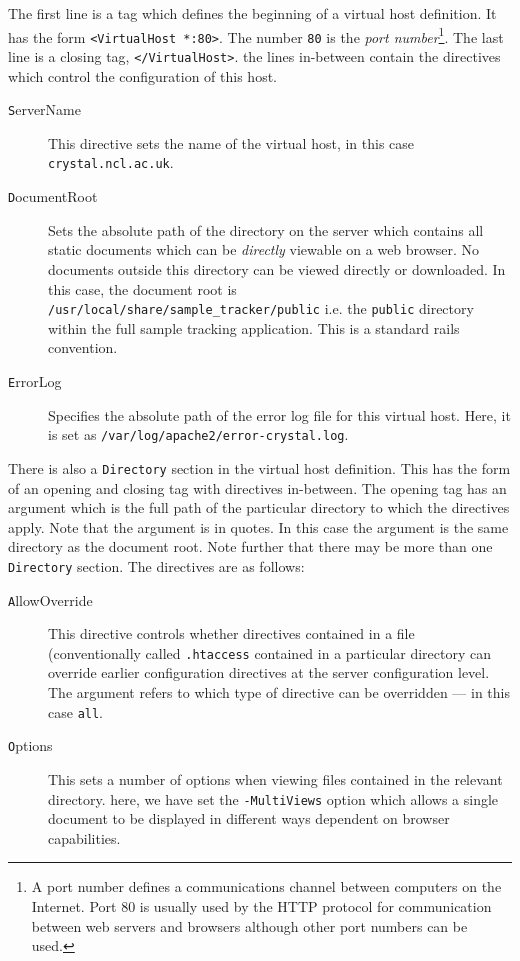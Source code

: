 \documentclass[12pt,twoside]{article}
\begin{document}
The first line is a tag which defines the beginning of a virtual host
definition. It has the form \verb=<VirtualHost *:80>=. The number \verb=80=
is the \emph{port number}\footnote{A port number defines a communications
channel between computers on the Internet. Port 80 is usually
used by the HTTP protocol for communication between web servers and browsers
although other port numbers can be used.}.
The last line is a closing tag, \verb=</VirtualHost>=. the lines in-between
contain the directives which control the configuration of this host.
\begin{description}
\item[\texttt ServerName]
This directive sets the name of the virtual host, in this case
\verb=crystal.ncl.ac.uk=.
\item[\texttt DocumentRoot]
Sets the absolute path of the directory on the server which contains
all static documents which can be \emph{directly} viewable on a web browser.
No documents outside this directory can be viewed directly or downloaded.
In this case, the document root is 
\verb=/usr/local/share/sample_tracker/public=
i.e. the \verb=public= directory within the full sample tracking application.
This is a standard rails convention.
\item[\texttt ErrorLog]
Specifies the absolute path of the error log file for this virtual host.
Here, it is set as \verb=/var/log/apache2/error-crystal.log=.
\end{description}
There is also a \verb=Directory= section in the virtual host definition.
This has the form of an opening and closing tag with directives in-between.
The opening tag has an argument which is the full path of the particular
directory to which the directives apply. Note that the argument is in quotes.
In this case the argument is the same directory as the document root.
Note further that there may be more than one \verb=Directory= section.
The directives are as follows:
\begin{description}
\item[\texttt AllowOverride]
This directive controls whether directives contained in a file
(conventionally called \verb=.htaccess= contained in a particular
directory can override earlier configuration directives at the server
configuration level. The argument refers to which type of directive
can be overridden --- in this case \verb=all=.
\item[\texttt Options]
This sets a number of options when viewing files contained in the
relevant directory. here, we have set the \verb=-MultiViews= option
which allows a single document to be displayed in different ways dependent
on browser capabilities.
\end{description}
\end{document}
